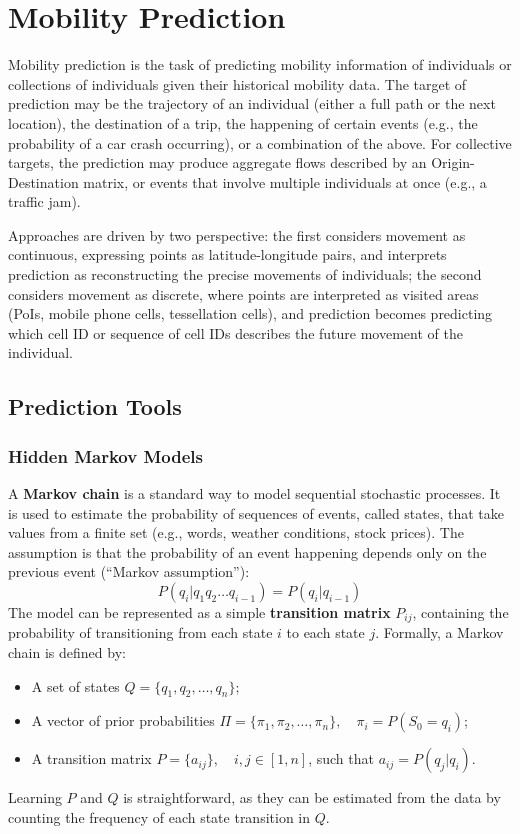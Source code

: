 \chapter{Mobility Prediction}

Mobility prediction is the task of predicting mobility information of individuals or collections of individuals given their historical mobility data. The target of prediction may be the trajectory of an individual (either a full path or the next location), the destination of a trip, the happening of certain events (e.g., the probability of a car crash occurring), or a combination of the above. For collective targets, the prediction may produce aggregate flows described by an Origin-Destination matrix, or events that involve multiple individuals at once (e.g., a traffic jam).

Approaches are driven by two perspective: the first considers movement as continuous, expressing points as latitude-longitude pairs, and interprets prediction as reconstructing the precise movements of individuals; the second considers movement as discrete, where points are interpreted as visited areas (PoIs, mobile phone cells, tessellation cells), and prediction becomes predicting which cell ID or sequence of cell IDs describes the future movement of the individual.

\section{Prediction Tools}

\subsection{Hidden Markov Models}

A \textbf{Markov chain} is a standard way to model sequential stochastic processes. It is used to estimate the probability of sequences of events, called states, that take values from a finite set (e.g., words, weather conditions, stock prices). The assumption  is that the probability of an event happening depends only on the previous event (``Markov assumption''):
\begin{equation*}
    P(q_i | q_1 q_2 \dots q_{i-1}) = P(q_i | q_{i-1})
\end{equation*}
The model can be represented as a simple \textbf{transition matrix} $P_{ij}$, containing the probability of transitioning from each state $i$ to each state $j$. Formally, a Markov chain is defined by:
\begin{itemize}[noitemsep]
    \item A set of states $Q = \{q_1, q_2, \dots, q_n\}$;
    \item A vector of prior probabilities $\Pi = \{\pi_1, \pi_2, \dots, \pi_n\}, \quad \pi_i = P(S_0 = q_i)$;
    \item A transition matrix $P = \{ a_{ij} \}, \quad i,j \in [1,n]$, such that $a_{ij} = P(q_j|q_i)$.
\end{itemize}
Learning $P$ and $Q$ is straightforward, as they can be estimated from the data by counting the frequency of each state transition in $Q$.

